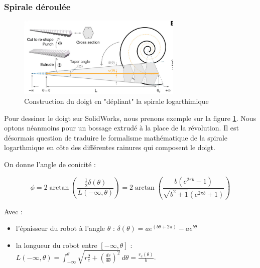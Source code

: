 \documentclass[a4paper, 11pt]{report}
\begin{document}
        \subsubsection{Spirale déroulée}

            \begin{figure}
                \centering
                \includegraphics[width=0.7\textwidth]{Figures/draw_solidworks.png}
                \caption{Construction du doigt en "dépliant" la spirale logarthimique \cite{wang_spirobs_2025}}
                \label{fig:draw_solidworks}
            \end{figure}

            Pour dessiner le doigt sur SolidWorks, nous prenons exemple sur la figure \ref{fig:draw_solidworks}. Nous optons néanmoins pour un bossage extrudé à la place de la révolution. Il est désormais question de traduire le formalisme mathématique de la spirale logarthmique en côte des différentes rainures qui composent le doigt.

            On donne l'angle de conicité :

            \begin{equation}
            \phi = 2\arctan \left(
                \frac{\frac{1}{2}\delta(\theta)}{L(-\infty, \theta)}
                \right) = 2 \arctan\left(\frac{b(e^{2\pi b}-1)}{\sqrt{b^2+1} \left(e^{2\pi b}+1\right)}\right)
            \label{eq:angle_de_conicite}
            \end{equation}

            Avec :

            \begin{itemize}
                \item l'épaisseur du robot à l'angle $\theta$ : $\delta(\theta) = ae^{(b\theta + 2\pi)} - ae^{b\theta}$
                \item la longueur du robot entre $[-\infty,\theta]$ : $L(-\infty, \theta) = \int_{-\infty}^{\theta} \sqrt{r_c^2 + \left(\frac{dr}{d\theta}\right)^2} \, d\theta = \frac{r_c(\theta)}{b}$.
            \end{itemize}
\end{document}
